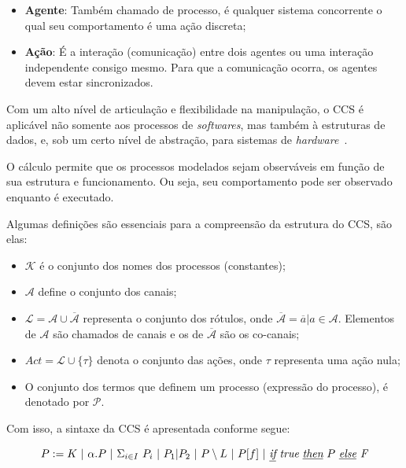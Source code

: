 \begin{itemize}
	\item \textbf{Agente}: Também chamado de processo, é qualquer sistema concorrente o qual seu comportamento é uma ação discreta;
	\item \textbf{Ação}: É a interação (comunicação) entre dois agentes ou uma interação independente consigo mesmo. Para que a comunicação ocorra, os agentes devem estar sincronizados. 
\end{itemize}

Com um alto nível de articulação e flexibilidade na manipulação, o CCS é aplicável não somente aos processos de \textit{softwares}, mas também à estruturas de dados, e, sob um certo nível de abstração, para sistemas de \textit{hardware}~\cite{milner1986ccs}. 

O cálculo permite que os processos modelados sejam observáveis em função de sua estrutura e funcionamento. Ou seja, seu comportamento pode ser observado enquanto é executado.

Algumas definições são essenciais para a compreensão da estrutura do CCS, são elas:

\begin{itemize}
	\item $\mathcal{K}$ é o conjunto dos nomes dos  processos (constantes);
	\item $\mathcal{A}$ define o conjunto dos canais;
	\item $\mathcal{L} = \mathcal{A} \cup \mathcal{\overline{A}}$ representa o conjunto dos rótulos, onde $\mathcal{\overline{A}} = \overline{a} | a \in \mathcal{A}$. Elementos de $\mathcal{A}$ são chamados de canais e os de $\mathcal{\overline{A}}$ são os co-canais;
	\item $Act = \mathcal{L} \cup \{\tau\}$ denota o conjunto das ações, onde $\tau$ representa uma ação nula;
	\item O conjunto dos termos que definem um processo (expressão do processo), é denotado por $\mathcal{P}$. 		
\end{itemize}

Com isso, a sintaxe da CCS é apresentada conforme segue:

\begin{equation}
	P := K~|
	~\alpha.P~|
	~\Sigma_{i\in I}~P_{i}~|
	~P_{1} | P_{2}~|
	~P \setminus L~|
	~P[f]~|
	~\textit{\underline{if}}~\textit{true}~\textit{\underline{then}}~P~\textit{\underline{else}~F}
\end{equation}


